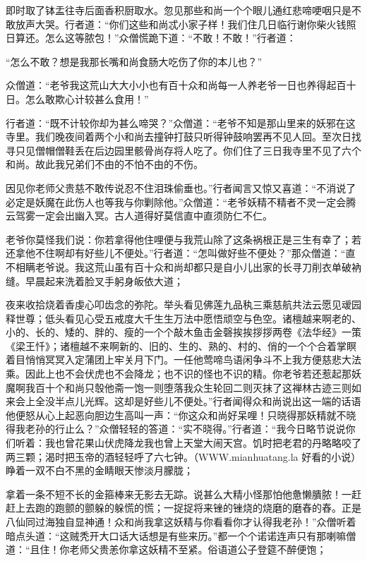 \documentclass[12pt,UTF8]{ctexbook}
\begin{document}
{	即时取了钵盂往寺后面香积厨取水。忽见那些和尚一个个眼儿通红悲啼哽咽只是不敢放声大哭。行者道：“你们这些和尚忒小家子样！我们住几日临行谢你柴火钱照日算还。怎么这等脓包！”众僧慌跪下道：“不敢！不敢！”行者道：
	
	“怎么不敢？想是我那长嘴和尚食肠大吃伤了你的本儿也？”
	
	众僧道：“老爷我这荒山大大小小也有百十众和尚每一人养老爷一日也养得起百十日。怎么敢欺心计较甚么食用！”
	
	行者道：“既不计较你却为甚么啼哭？”众僧道：“老爷不知是那山里来的妖邪在这寺里。我们晚夜间着两个小和尚去撞钟打鼓只听得钟鼓响罢再不见人回。至次日找寻只见僧帽僧鞋丢在后边园里骸骨尚存将人吃了。你们住了三日我寺里不见了六个和尚。故此我兄弟们不由的不怕不由的不伤。
	
	因见你老师父贵慈不敢传说忍不住泪珠偷垂也。”行者闻言又惊又喜道：“不消说了必定是妖魔在此伤人也等我与你剿除他。”众僧道：“老爷妖精不精者不灵一定会腾云驾雾一定会出幽入冥。古人道得好莫信直中直须防仁不仁。
	
	老爷你莫怪我们说：你若拿得他住哩便与我荒山除了这条祸根正是三生有幸了；若还拿他不住啊却有好些儿不便处。”行者道：“怎叫做好些不便处？”那众僧道：“直不相瞒老爷说。我这荒山虽有百十众和尚却都只是自小儿出家的长寻刀削衣单破衲缝。早晨起来洗着脸叉手躬身皈依大道；
	
	夜来收拾烧着香虔心叩齿念的弥陀。举头看见佛莲九品秇三乘慈航共法云愿见叆园释世尊；低头看见心受五戒度大千生生万法中愿悟顽空与色空。诸檀越来啊老的、小的、长的、矮的、胖的、瘦的一个个敲木鱼击金磬挨挨拶拶两卷《法华经》一策《梁王忏》；诸檀越不来啊新的、旧的、生的、熟的、村的、俏的一个个合着掌瞑着目悄悄冥冥入定蒲团上牢关月下门。一任他莺啼鸟语闲争斗不上我方便慈悲大法乘。因此上也不会伏虎也不会降龙；也不识的怪也不识的精。你老爷若还惹起那妖魔啊我百十个和尚只彀他斋一饱一则堕落我众生轮回二则灭抹了这禅林古迹三则如来会上全没半点儿光辉。这却是好些儿不便处。”行者闻得众和尚说出这一端的话语他便怒从心上起恶向胆边生高叫一声：“你这众和尚好呆哩！只晓得那妖精就不晓得我老孙的行止么？”众僧轻轻的答道：“实不晓得。”行者道：“我今日略节说说你们听着：我也曾花果山伏虎降龙我也曾上天堂大闹天宫。饥时把老君的丹略略咬了两三颗；渴时把玉帝的酒轻轻呼了六七钟。（WWW.mianhuatang.la 好看的小说）睁着一双不白不黑的金睛眼天惨淡月朦胧；
	
	拿着一条不短不长的金箍棒来无影去无踪。说甚么大精小怪那怕他惫懒膭脓！一赶赶上去跑的跑颤的颤躲的躲慌的慌；一捉捉将来锉的锉烧的烧磨的磨舂的舂。正是八仙同过海独自显神通！众和尚我拿这妖精与你看看你才认得我老孙！”众僧听着暗点头道：“这贼秃开大口话大话想是有些来历。”都一个个诺诺连声只有那喇嘛僧道：“且住！你老师父贵恙你拿这妖精不至紧。俗语道公子登筵不醉便饱；
	
}
\end{document}
